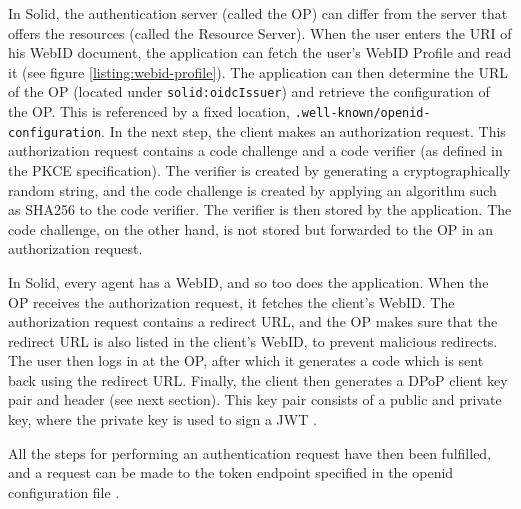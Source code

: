 In Solid, the authentication server (called the \gls{OP}) can differ from the server that offers the resources (called the Resource Server).  When the user enters the URI of his WebID document, the application can fetch the user's WebID Profile and read it (see figure \ref{listing:webid-profile}). The application can then determine the URL of the \acrfull{OP} (located under \texttt{solid:oidcIssuer}) and retrieve the configuration of the \gls{OP}. This is referenced by a fixed location, \texttt{.well-known/openid-configuration}. 
In the next step, the client makes an authorization request. This authorization request contains a code challenge and a code verifier (as defined in the \acrshort{PKCE} specification). The verifier is created by generating a cryptographically random string, and the code challenge is created by applying an algorithm such as SHA256 to the code verifier. The verifier is then stored by the application. The code challenge, on the other hand, is not stored but forwarded to the \gls{OP} in an authorization request. 

In Solid, every agent has a WebID, and so too does the application. When the \gls{OP} receives the authorization request, it fetches the client's WebID. The authorization request contains a redirect URL, and the \gls{OP} makes sure that the redirect URL is also listed in the client's WebID, to prevent malicious redirects. The user then logs in at the \gls{OP}, after which it generates a code which is sent back using the redirect URL. Finally, the client then generates a \gls{DPoP} client key pair and header (see next section). This key pair consists of a public and private key, where the private key is used to sign a \gls{JWT} \citep{JWT}.

All the steps for performing an authentication request have then been fulfilled, and a request can be made to the token endpoint specified in the openid configuration file \citep{solid-oidc-primer}. 


